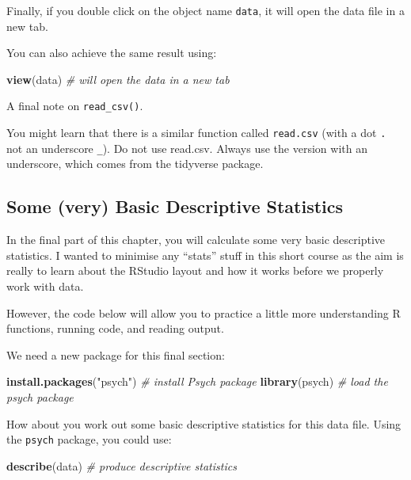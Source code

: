 \documentclass[
]{book}
\newenvironment{Shaded}{\begin{snugshade}}{\end{snugshade}}
\newcommand{\CommentTok}[1]{\textcolor[rgb]{0.56,0.35,0.01}{\textit{#1}}}
\newcommand{\FunctionTok}[1]{\textcolor[rgb]{0.13,0.29,0.53}{\textbf{#1}}}
\newcommand{\NormalTok}[1]{#1}
\newcommand{\StringTok}[1]{\textcolor[rgb]{0.31,0.60,0.02}{#1}}
\let\oldsubsection\subsection
\renewcommand{\subsection}{\needspace{3\baselineskip}\oldsubsection}  %
\begin{document}
Finally, if you double click on the object name \texttt{data}, it will open the data file in a new tab.

You can also achieve the same result using:

\begin{Shaded}
\begin{Highlighting}[]
\FunctionTok{view}\NormalTok{(data) }\CommentTok{\# will open the data in a new tab}
\end{Highlighting}
\end{Shaded}

A final note on \texttt{read\_csv()}.

You might learn that there is a similar function called \texttt{read.csv} (with a dot \texttt{.} not an underscore \texttt{\_}). Do not use read.csv. Always use the version with an underscore, which comes from the tidyverse package.

\subsection{Some (very) Basic Descriptive Statistics}\label{some-very-basic-descriptive-statistics}

In the final part of this chapter, you will calculate some very basic descriptive statistics. I wanted to minimise any ``stats'' stuff in this short course as the aim is really to learn about the RStudio layout and how it works before we properly work with data.

However, the code below will allow you to practice a little more understanding R functions, running code, and reading output.

We need a new package for this final section:

\begin{Shaded}
\begin{Highlighting}[]
\FunctionTok{install.packages}\NormalTok{(}\StringTok{"psych"}\NormalTok{) }\CommentTok{\# install Psych package}
\FunctionTok{library}\NormalTok{(psych) }\CommentTok{\# load the psych package}
\end{Highlighting}
\end{Shaded}

How about you work out some basic descriptive statistics for this data file. Using the \texttt{psych} package, you could use:

\begin{Shaded}
\begin{Highlighting}[]
\FunctionTok{describe}\NormalTok{(data) }\CommentTok{\# produce descriptive statistics}
\end{Highlighting}
\end{Shaded}
\end{document}

